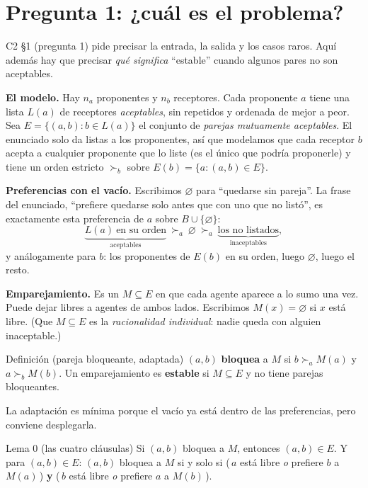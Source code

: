\documentclass[11pt]{article}
\begin{document}
\section{Pregunta 1: ¿cuál es el problema?}

C2 §1 (pregunta 1) pide precisar la entrada, la salida y los casos raros. Aquí además hay que precisar \emph{qué significa}
``estable'' cuando algunos pares no son aceptables.

\textbf{El modelo.} Hay $n_a$ proponentes y $n_b$ receptores. Cada proponente $a$ tiene una lista $L(a)$ de
receptores \emph{aceptables}, sin repetidos y ordenada de mejor a peor. Sea $E=\{(a,b):b\in L(a)\}$ el conjunto de
\emph{parejas mutuamente aceptables}. El enunciado solo da listas a los proponentes, así que modelamos que cada
receptor $b$ acepta a cualquier proponente que lo liste (es el único que podría proponerle) y tiene un orden
estricto $\succ_b$ sobre $E(b)=\{a:(a,b)\in E\}$.

\textbf{Preferencias con el vacío.} Escribimos $\varnothing$ para ``quedarse sin pareja''. La frase del
enunciado, ``prefiere quedarse solo antes que con uno que no listó'', es exactamente esta preferencia de $a$ sobre
$B\cup\{\varnothing\}$:
\[
  \underbrace{L(a)\ \text{en su orden}}_{\text{aceptables}}\ \succ_a\ \varnothing\ \succ_a\ \underbrace{\text{los no listados}}_{\text{inaceptables}} ,
\]
y análogamente para $b$: los proponentes de $E(b)$ en su orden, luego $\varnothing$, luego el resto.

\textbf{Emparejamiento.} Es un $M\subseteq E$ en que cada agente aparece a lo sumo una vez. Puede dejar libres a
agentes de ambos lados. Escribimos $M(x)=\varnothing$ si $x$ está libre. (Que $M\subseteq E$ es la
\emph{racionalidad individual}: nadie queda con alguien inaceptable.)

\begin{resultado}{Definición (pareja bloqueante, adaptada)}
$(a,b)$ \textbf{bloquea} a $M$ si $b\succ_a M(a)$ y $a\succ_b M(b)$. Un emparejamiento es \textbf{estable} si
$M\subseteq E$ y no tiene parejas bloqueantes.
\end{resultado}

La adaptación es mínima porque el vacío ya está dentro de las preferencias, pero conviene desplegarla.

\begin{resultado}{Lema 0 (las cuatro cláusulas)}
Si $(a,b)$ bloquea a $M$, entonces $(a,b)\in E$. Y para $(a,b)\in E$: $(a,b)$ bloquea a $M$ si y solo si
(\,$a$ está libre \emph{o} prefiere $b$ a $M(a)$\,) \textbf{y} (\,$b$ está libre \emph{o} prefiere $a$ a
$M(b)$\,).
\end{resultado}
\end{document}
